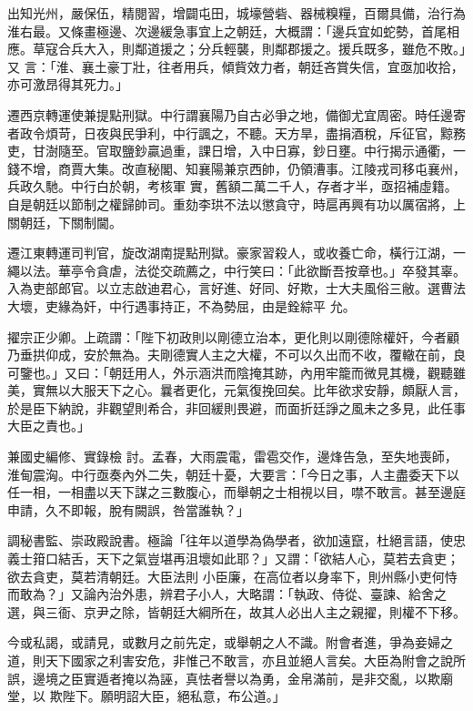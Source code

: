 \begin{pinyinscope}
 出知光州，嚴保伍，精閱習，增闢屯田，城壕營砦、器械糗糧，百爾具備，治行為淮右最。又條畫極邊、次邊緩急事宜上之朝廷，大概謂：「邊兵宜如蛇勢，首尾相應。草寇合兵大入，則鄰道援之；分兵輕襲，則鄰郡援之。援兵既多，雖危不敗。」又
 言：「淮、襄土豪丁壯，往者用兵，傾貲效力者，朝廷吝賞失信，宜亟加收拾，亦可激昂得其死力。」



 遷西京轉運使兼提點刑獄。中行謂襄陽乃自古必爭之地，備御尤宜周密。時任邊寄者政令煩苛，日夜與民爭利，中行諷之，不聽。天方旱，盡捐酒稅，斥征官，黥務吏，甘澍隨至。官取鹽鈔贏過重，課日增，入中日寡，鈔日壅。中行揭示通衢，一錢不增，商賈大集。改直秘閣、知襄陽兼京西帥，仍領漕事。江陵戎司移屯襄州，兵政久馳。中行白於朝，考核軍
 實，舊額二萬二千人，存者才半，亟招補虛籍。自是朝廷以節制之權歸帥司。重劾李珙不法以懲貪守，時扈再興有功以厲宿將，上關朝廷，下關制閫。



 遷江東轉運司判官，旋改湖南提點刑獄。豪家習殺人，或收養亡命，橫行江湖，一繩以法。華亭令貪虐，法從交疏薦之，中行笑曰：「此欲斷吾按章也。」卒發其辜。入為吏部郎官。以立志啟迪君心，言好進、好同、好欺，士大夫風俗三敝。選曹法大壞，吏緣為奸，中行遇事持正，不為勢屈，由是銓綜平
 允。



 擢宗正少卿。上疏謂：「陛下初政則以剛德立治本，更化則以剛德除權奸，今者顧乃垂拱仰成，安於無為。夫剛德實人主之大權，不可以久出而不收，覆轍在前，良可鑒也。」又曰：「朝廷用人，外示涵洪而陰掩其跡，內用牢籠而微見其機，觀聽雖美，實無以大服天下之心。曩者更化，元氣復挽回矣。比年欲求安靜，頗厭人言，於是臣下納說，非觀望則希合，非回緩則畏避，而面折廷諍之風未之多見，此任事大臣之責也。」



 兼國史編修、實錄檢
 討。孟春，大雨震電，雷雹交作，邊烽告急，至失地喪師，淮甸震洶。中行亟奏內外二失，朝廷十憂，大要言：「今日之事，人主盡委天下以任一相，一相盡以天下謀之三數腹心，而舉朝之士相視以目，噤不敢言。甚至邊庭申請，久不即報，脫有闕誤，咎當誰執？」



 調秘書監、崇政殿說書。極論「往年以道學為偽學者，欲加遠竄，杜絕言語，使忠義士箝口結舌，天下之氣豈堪再沮壞如此耶？」又謂：「欲結人心，莫若去貪吏；欲去貪吏，莫若清朝廷。大臣法則
 小臣廉，在高位者以身率下，則州縣小吏何恃而敢為？」又論內治外患，辨君子小人，大略謂：「執政、侍從、臺諫、給舍之選，與三衙、京尹之除，皆朝廷大綱所在，故其人必出人主之親擢，則權不下移。



 今或私謁，或請見，或數月之前先定，或舉朝之人不識。附會者進，爭為妾婦之道，則天下國家之利害安危，非惟己不敢言，亦且並絕人言矣。大臣為附會之說所誤，邊境之臣實遁者掩以為誣，真怯者譽以為勇，金帛滿前，是非交亂，以欺廟堂，以
 欺陛下。願明詔大臣，絕私意，布公道。」




\end{pinyinscope}
